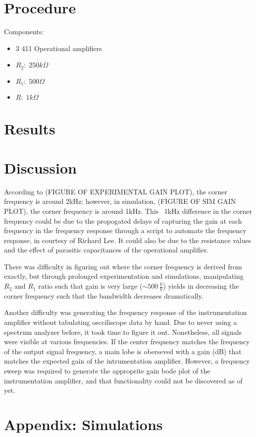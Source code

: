 \documentclass{article}
\begin{document}
\section{Procedure}
Components: 
\begin{itemize}
    \item 3 411 Operational amplifiers
    \item $R_2:\;250k\Omega$
    \item $R_1:\;500\Omega$
    \item $R:\;1k\Omega$
\end{itemize}
\section{Results}
\section{Discussion}
According to (FIGURE OF EXPERIMENTAL GAIN PLOT), the corner frequency is around 2kHz; however, in simulation, (FIGURE OF SIM GAIN PLOT), the corner frequency is around 1kHz. This ~1kHz difference in the corner frequency could be due to the propogated delays of capturing the gain at each frequency in the frequency response through a script to automate the frequency response, in courtesy of Richard Lee. It could also be due to the resistance values and the effect of parasitic capacitances of the operational amplifier. 

There was difficulty in figuring out where the corner frequency is derived from exactly, but through prolonged experimentation and simulations, manipulating $R_2$ and $R_1$ ratio such that gain is very large ($\sim500\,\frac{V}{V}$) yields in decreasing the corner frequency such that the bandwidth decreases dramatically. 

Another difficulty was generating the frequency response of the instrumentation amplifier without tabulating oscciliscope data by hand. Due to never using a spectrum analyzer before, it took time to figure it out. Nonetheless, all signals were visible at various frequencies. If the center frequency matches the frequency of the output signal frequency, a main lobe is oberseved with a gain (dB) that matches the expected gain of the intrumentation amplifier. However, a frequency sweep was required to generate the approprite gain bode plot of the instrumentation amplifier, and that functionality could not be discovered as of yet.
\section{Appendix: Simulations}
\end{document}

